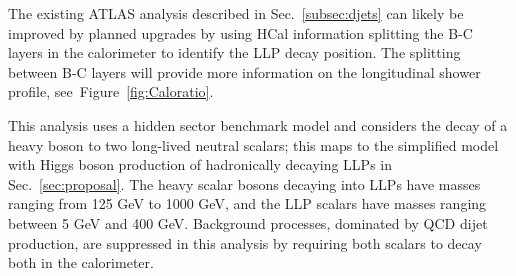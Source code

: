 The existing ATLAS analysis described in Sec.~\ref{subsec:djets} can likely be improved by planned upgrades by using HCal information splitting the B-C layers in the calorimeter to identify the LLP decay position. %
The splitting between B-C layers will provide more information on the longitudinal shower profile, see~Figure~\ref{fig:Caloratio}.

This analysis uses a hidden sector benchmark model and considers the decay of a heavy boson to two long-lived neutral scalars; this maps to the simplified model with Higgs boson production of hadronically decaying LLPs in Sec.~\ref{sec:proposal}. The heavy scalar bosons decaying into LLPs have masses ranging from 125 GeV to 1000 GeV, and the LLP scalars have masses ranging between 5 GeV and 400 GeV.
Background processes, dominated by QCD dijet production, are suppressed in this analysis by requiring both scalars to decay both in the calorimeter.


